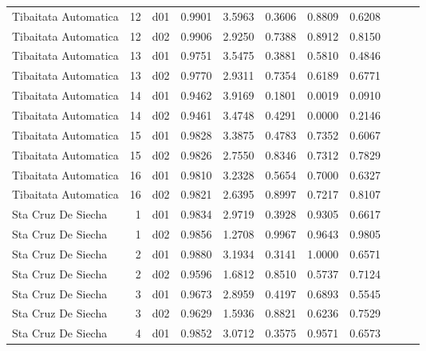 \begin{landscape}
\begin{longtable}{p{2cm}rrrrrrrrrr}
 Tibaitata Automatica  &         12 &     d01 &   0.9901 &  3.5963 &        0.3606 &           0.8809 &  0.6208 \\
 Tibaitata Automatica  &         12 &     d02 &   0.9906 &  2.9250 &        0.7388 &           0.8912 &  0.8150 \\
 Tibaitata Automatica  &         13 &     d01 &   0.9751 &  3.5475 &        0.3881 &           0.5810 &  0.4846 \\
 Tibaitata Automatica  &         13 &     d02 &   0.9770 &  2.9311 &        0.7354 &           0.6189 &  0.6771 \\
 Tibaitata Automatica  &         14 &     d01 &   0.9462 &  3.9169 &        0.1801 &           0.0019 &  0.0910 \\
 Tibaitata Automatica  &         14 &     d02 &   0.9461 &  3.4748 &        0.4291 &           0.0000 &  0.2146 \\
 Tibaitata Automatica  &         15 &     d01 &   0.9828 &  3.3875 &        0.4783 &           0.7352 &  0.6067 \\
 Tibaitata Automatica  &         15 &     d02 &   0.9826 &  2.7550 &        0.8346 &           0.7312 &  0.7829 \\
 Tibaitata Automatica  &         16 &     d01 &   0.9810 &  3.2328 &        0.5654 &           0.7000 &  0.6327 \\
 Tibaitata Automatica  &         16 &     d02 &   0.9821 &  2.6395 &        0.8997 &           0.7217 &  0.8107 \\
   Sta Cruz De Siecha  &          1 &     d01 &   0.9834 &  2.9719 &        0.3928 &           0.9305 &  0.6617 \\
   Sta Cruz De Siecha  &          1 &     d02 &   0.9856 &  1.2708 &        0.9967 &           0.9643 &  0.9805 \\
   Sta Cruz De Siecha  &          2 &     d01 &   0.9880 &  3.1934 &        0.3141 &           1.0000 &  0.6571 \\
   Sta Cruz De Siecha  &          2 &     d02 &   0.9596 &  1.6812 &        0.8510 &           0.5737 &  0.7124 \\
   Sta Cruz De Siecha  &          3 &     d01 &   0.9673 &  2.8959 &        0.4197 &           0.6893 &  0.5545 \\
   Sta Cruz De Siecha  &          3 &     d02 &   0.9629 &  1.5936 &        0.8821 &           0.6236 &  0.7529 \\
   Sta Cruz De Siecha  &          4 &     d01 &   0.9852 &  3.0712 &        0.3575 &           0.9571 &  0.6573 \\

\end{longtable}
\end{landscape}
